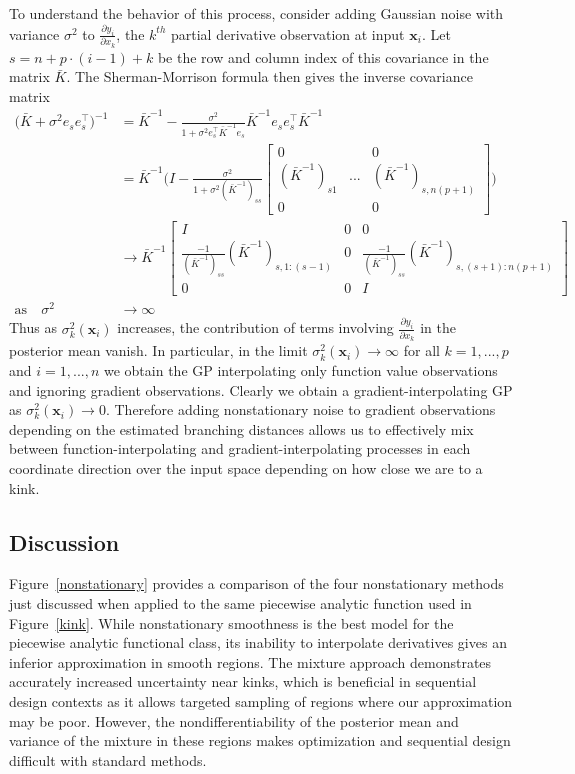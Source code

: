 \documentclass{article}
\newcommand{\mat}[1]{\begin{bmatrix}#1\end{bmatrix}}
\renewcommand{\vec}[1]{\mathbf{#1}}
\begin{document}
To understand the behavior of this process, consider adding Gaussian noise with variance $\sigma^2$ to $\frac{\partial y_i}{\partial x_k}$, the $k^{th}$ partial derivative observation at input $\vec{x}_i$. Let $s = n + p \cdot (i-1) + k$ be the row and column index of this covariance in the matrix $\bar{K}$. The Sherman-Morrison formula then gives the inverse covariance matrix
\begin{align*}
  \Big(\bar{K} + \sigma^2 e_s e_s^\top\Big)^{-1}
  & = \bar{K}^{-1} - \frac{\sigma^2}{1 + \sigma^2 e_s^\top \bar{K}^{-1} e_s} \bar{K}^{-1} e_s e_s^\top \bar{K}^{-1} \\
  & = \bar{K}^{-1} \Bigg(I - \frac{\sigma^2}{1 + \sigma^2 (\bar{K}^{-1})_{ss}} \mat{0 & & 0 \\ (\bar{K}^{-1})_{s1} & ... & (\bar{K}^{-1})_{s,n(p+1)} \\ 0 & & 0} \Bigg) \\
  & \to \bar{K}^{-1} \mat{ I & 0 & 0 \\ \frac{-1}{(\bar{K}^{-1})_{ss}}(\bar{K}^{-1})_{s,1:(s-1)} & 0 & \frac{-1}{(\bar{K}^{-1})_{ss}}(\bar{K}^{-1})_{s,(s+1):n(p+1)} \\ 0 & 0 & I } \\
  \text{as} \quad \sigma^2 & \to \infty
\end{align*}
Thus as $\sigma^2_k(\vec{x}_i)$ increases, the contribution of terms involving $\frac{\partial y_i}{\partial x_k}$ in the posterior mean vanish. In particular, in the limit $\sigma^2_k(\vec{x}_i) \to \infty$ for all $k=1,...,p$ and $i=1,...,n$ we obtain the GP interpolating only function value observations and ignoring gradient observations. Clearly we obtain a gradient-interpolating GP as $\sigma^2_k(\vec{x}_i) \to 0$. Therefore adding nonstationary noise to gradient observations depending on the estimated branching distances allows us to effectively mix between function-interpolating and gradient-interpolating processes in each coordinate direction over the input space depending on how close we are to a kink.

\subsection{Discussion}
Figure~\ref{nonstationary} provides a comparison of the four nonstationary methods just discussed when applied to the same piecewise analytic function used in Figure~\ref{kink}. While nonstationary smoothness is the best model for the piecewise analytic functional class, its inability to interpolate derivatives gives an inferior approximation in smooth regions. The mixture approach demonstrates accurately increased uncertainty near kinks, which is beneficial in sequential design contexts as it allows targeted sampling of regions where our approximation may be poor. However, the nondifferentiability of the posterior mean and variance of the mixture in these regions makes optimization and sequential design difficult with standard methods.
\end{document}
